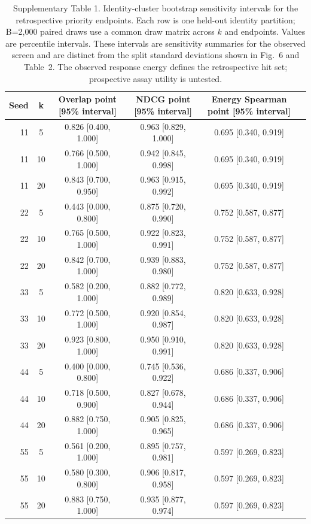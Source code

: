 \begin{table}[ht]\centering\scriptsize\caption{Supplementary Table 1. Identity-cluster bootstrap sensitivity intervals for the retrospective priority endpoints. Each row is one held-out identity partition; B=2,000 paired draws use a common draw matrix across $k$ and endpoints. Values are percentile intervals. These intervals are sensitivity summaries for the observed screen and are distinct from the split standard deviations shown in Fig.~6 and Table~2. The observed response energy defines the retrospective hit set; prospective assay utility is untested.}\label{tab:priority_bootstrap}\begin{tabular}{rccccl}\toprule Seed & k & Overlap point [95\% interval] & NDCG point [95\% interval] & Energy Spearman point [95\% interval] \\ \midrule
11 & 5 & 0.826 [0.400, 1.000] & 0.963 [0.829, 1.000] & 0.695 [0.340, 0.919] \\
11 & 10 & 0.766 [0.500, 1.000] & 0.942 [0.845, 0.998] & 0.695 [0.340, 0.919] \\
11 & 20 & 0.843 [0.700, 0.950] & 0.963 [0.915, 0.992] & 0.695 [0.340, 0.919] \\
22 & 5 & 0.443 [0.000, 0.800] & 0.875 [0.720, 0.990] & 0.752 [0.587, 0.877] \\
22 & 10 & 0.765 [0.500, 1.000] & 0.922 [0.823, 0.991] & 0.752 [0.587, 0.877] \\
22 & 20 & 0.842 [0.700, 1.000] & 0.939 [0.883, 0.980] & 0.752 [0.587, 0.877] \\
33 & 5 & 0.582 [0.200, 1.000] & 0.882 [0.772, 0.989] & 0.820 [0.633, 0.928] \\
33 & 10 & 0.772 [0.500, 1.000] & 0.920 [0.854, 0.987] & 0.820 [0.633, 0.928] \\
33 & 20 & 0.923 [0.800, 1.000] & 0.950 [0.910, 0.991] & 0.820 [0.633, 0.928] \\
44 & 5 & 0.400 [0.000, 0.800] & 0.745 [0.536, 0.922] & 0.686 [0.337, 0.906] \\
44 & 10 & 0.718 [0.500, 0.900] & 0.827 [0.678, 0.944] & 0.686 [0.337, 0.906] \\
44 & 20 & 0.882 [0.750, 1.000] & 0.905 [0.825, 0.965] & 0.686 [0.337, 0.906] \\
55 & 5 & 0.561 [0.200, 1.000] & 0.895 [0.757, 0.981] & 0.597 [0.269, 0.823] \\
55 & 10 & 0.580 [0.300, 0.800] & 0.906 [0.817, 0.958] & 0.597 [0.269, 0.823] \\
55 & 20 & 0.883 [0.750, 1.000] & 0.935 [0.877, 0.974] & 0.597 [0.269, 0.823] \\
\bottomrule\end{tabular}\end{table}
